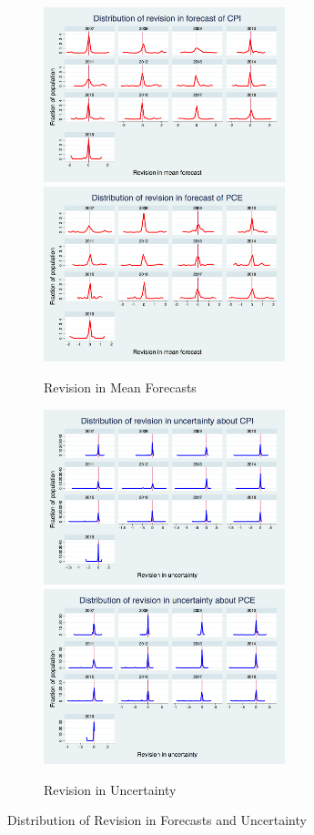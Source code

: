 \documentclass[12pt]{article}
\begin{document}
	
	\begin{figure}[p]
		\begin{subfigure}[b]{0.5\textwidth}
		\centering
		\caption{Revision in Mean Forecasts}
		\includegraphics[width=7cm]{figures/PRCCPIMean01_rv_true_hist.png} 
		\smallskip
		\includegraphics[width=7cm]{figures/PRCPCEMean01_rv_true_hist.png} 
		\end{subfigure}
		   \hfill 
		\begin{subfigure}[b]{0.5\textwidth}
					\caption{Revision in Uncertainty}
		\includegraphics[width=7cm]{figures/PRCCPIVar01_rv_true_hist.png}  
		\smallskip
		\includegraphics[width=7cm]{figures/PRCPCEVar01_rv_true_hist.png} 
		\end{subfigure}
		\caption{Distribution of Revision in Forecasts and Uncertainty}
		\label{RevisionHist}
	\end{figure}
	
\end{document}
